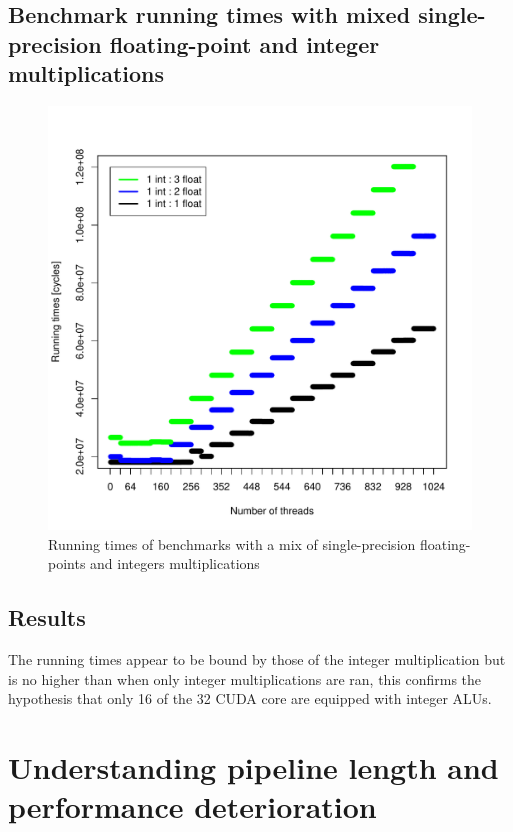 \documentclass{article}
\def \scalingfactor{.8}
\begin{document}
	\subsection{Benchmark running times with mixed single-precision floating-point and integer multiplications}
	\begin{figure}[h]
		\centering
		\vspace{-20pt}
        \includegraphics[width=\scalingfactor\linewidth]{"graphics/running_times_mixed"}
		\vspace{-15pt}
        \caption{Running times of benchmarks with a mix of single-precision floating-points and integers multiplications}
    \end{figure}

    \subsection{Results}
    The running times appear to be bound by those of the integer multiplication but is no higher than
    when only integer multiplications are ran, this confirms the hypothesis that only 16 of the 32
    CUDA core are equipped with integer ALUs.

\section{Understanding pipeline length and performance deterioration}
\end{document}
